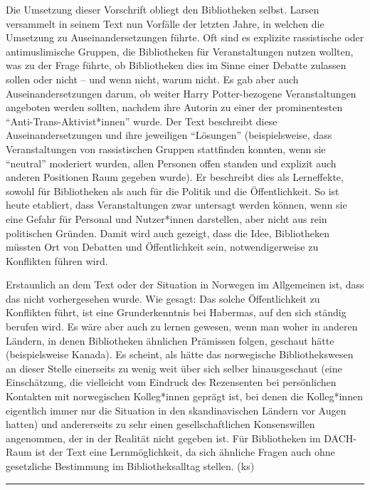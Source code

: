 \documentclass[a4paper,
fontsize=11pt,
oneside,
numbers=noperiodatend,
parskip=half-,
bibliography=totoc,
final
]{scrartcl}
\begin{document}
Die Umsetzung dieser Vorschrift obliegt den Bibliotheken selbst. Larsen
versammelt in seinem Text nun Vorfälle der letzten Jahre, in welchen die
Umsetzung zu Auseinandersetzungen führte. Oft sind es explizite
rassistische oder antimuslimische Gruppen, die Bibliotheken für
Veranstaltungen nutzen wollten, was zu der Frage führte, ob Bibliotheken
dies im Sinne einer Debatte zulassen sollen oder nicht -- und wenn
nicht, warum nicht. Es gab aber auch Auseinandersetzungen darum, ob
weiter Harry Potter-bezogene Veranstaltungen angeboten werden sollten,
nachdem ihre Autorin zu einer der prominentesten
\enquote{Anti-Trans-Aktivist*innen} wurde. Der Text beschreibt diese
Auseinandersetzungen und ihre jeweiligen \enquote{Lösungen}
(beispielsweise, dass Veranstaltungen von rassistischen Gruppen
stattfinden konnten, wenn sie \enquote{neutral} moderiert wurden, allen
Personen offen standen und explizit auch anderen Positionen Raum gegeben
wurde). Er beschreibt dies als Lerneffekte, sowohl für Bibliotheken als
auch für die Politik und die Öffentlichkeit. So ist heute etabliert,
dass Veranstaltungen zwar untersagt werden können, wenn sie eine Gefahr
für Personal und Nutzer*innen darstellen, aber nicht aus rein
politischen Gründen. Damit wird auch gezeigt, dass die Idee,
Bibliotheken müssten Ort von Debatten und Öffentlichkeit sein,
notwendigerweise zu Konflikten führen wird.

Erstaunlich an dem Text oder der Situation in Norwegen im Allgemeinen
ist, dass das nicht vorhergesehen wurde. Wie gesagt: Das solche
Öffentlichkeit zu Konflikten führt, ist eine Grunderkenntnis bei
Habermas, auf den sich ständig berufen wird. Es wäre aber auch zu lernen
gewesen, wenn man woher in anderen Ländern, in denen Bibliotheken
ähnlichen Prämissen folgen, geschaut hätte (beispielsweise Kanada). Es
scheint, als hätte das norwegische Bibliothekswesen an dieser Stelle
einerseits zu wenig weit über sich selber hinausgeschaut (eine
Einschätzung, die vielleicht vom Eindruck des Rezensenten bei
persönlichen Kontakten mit norwegischen Kolleg*innen geprägt ist, bei
denen die Kolleg*innen eigentlich immer nur die Situation in den
skandinavischen Ländern vor Augen hatten) und andererseits zu sehr einen
gesellschaftlichen Konsenswillen angenommen, der in der Realität nicht
gegeben ist. Für Bibliotheken im DACH-Raum ist der Text eine
Lernmöglichkeit, da sich ähnliche Fragen auch ohne gesetzliche
Bestimmung im Bibliotheksalltag stellen. (ks)

\begin{center}\rule{0.5\linewidth}{0.5pt}\end{center}
\end{document}
